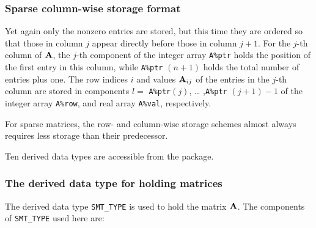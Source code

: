 \documentclass{galahad}
\begin{document}
\subsubsection{Sparse column-wise storage format}\label{columnwise}
Yet again only the nonzero entries are stored, but this time they are
ordered so that those in column $j$ appear directly before those in column
$j+1$. For the $j$-th column of ${\mathbf{A}}$, the $j$-th component of the integer
array {\tt A\%ptr} holds the position of the first entry in this column,
while {\tt A\%ptr} $(n+1)$ holds the total number of entries plus one.
The row indices $i$ and values ${\mathbf{A}}_{ij}$ of the entries in the
$j$-th column are stored in components $l =$ {\tt A\%ptr}$(j)$, \ldots
,{\tt A\%ptr} $(j+1)-1$ of the integer array {\tt A\%row}, and real
array {\tt A\%val}, respectively.

For sparse matrices, the row- and column-wise storage schemes almost always
requires less storage than their predecessor.


\galtypes
Ten derived data types are accessible from the package.


\subsubsection{The derived data type for holding matrices}\label{typesmt}
The derived data type {\tt SMT\_TYPE} is used to hold the matrix ${\mathbf{A}}$.
The components of {\tt SMT\_TYPE} used here are:
\end{document}

